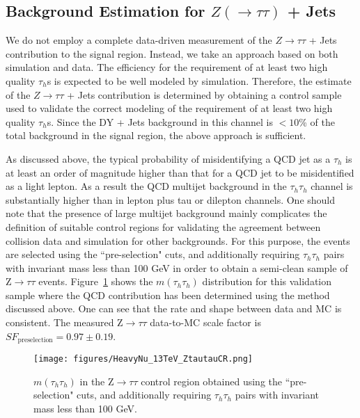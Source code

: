\subsection{\texorpdfstring{Background Estimation for $Z (\rightarrow \tau\tau)$ + Jets}{Background Estimation for Z (to tau tau) + Jets}}

We do not employ a complete data-driven measurement of the $Z\to\tau\tau$ + Jets contribution to the signal region. Instead, we take an approach based on
both simulation and data. The efficiency for the requirement of at least two high quality $\tau_{h}$s is expected to be well modeled by simulation. 
Therefore, the estimate of the $Z\to\tau\tau$ + Jets contribution is determined by obtaining a control sample used to validate the 
correct modeling of the requirement of at least two high quality $\tau_{h}$s. 
Since the DY + Jets background in this channel is 
$< 10$\% of the total background in the signal region, the above approach is sufficient. 

As discussed above, the typical probability of misidentifying a QCD jet as a $\tau_{h}$ is at least
an order of magnitude higher than that for a QCD jet to be misidentified as a light lepton. As a
result the QCD multijet background in the $\tau_{h}\tau_{h}$ channel is substantially higher
than in lepton plus tau or dilepton channels. One should note that the presence
of large multijet background mainly complicates the definition of suitable control regions for
validating the agreement between collision data and simulation for other backgrounds.
For this purpose, the events are selected using the ``pre-selection" cuts, and additionally requiring $\tau_{h}\tau_{h}$ pairs with
invariant mass less than 100 GeV in order to obtain a semi-clean sample of Z$\to\tau\tau$ events. 
Figure~\ref{fig:ZtautauControlDiHad} shows the $m(\tau_{h}\tau_{h})$ distribution for this validation sample where the QCD contribution has been determined using
the method discussed above. One can see that the rate and shape between data and MC is consistent. The measured Z$\to\tau\tau$ data-to-MC scale factor is {\bf 
$SF_{\textrm{preselection}} = 0.97 \pm 0.19$}.

\begin{figure}[tbh!]
  \centering
    \texttt{[image: figures/HeavyNu\_13TeV\_ZtautauCR.png]}
  \caption{ $m(\tau_{h}\tau_{h})$ in the Z$\to\tau\tau$ control region obtained using the ``pre-selection" cuts, and additionally requiring 
$\tau_{h}\tau_{h}$ pairs with invariant mass less than 100 GeV.}
  \label{fig:ZtautauControlDiHad}
\end{figure}
